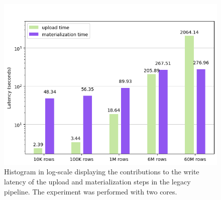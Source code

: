 \begin{figure}
\begin{minipage}[b]{\textwidth}
        \includegraphics[width=\textwidth]{figures/7-appendix/results_diagrams/write/hudi_upload_materialize/hudi_virtualiz2_core.png}
        \caption[Histogram of the write on legacy pipeline - Latency breakdown - 2 CPU cores]{Histogram in log-scale displaying the contributions to the write latency of the upload and materialization steps in the legacy pipeline. The experiment was performed with two  cores.}
        \label{fig:appx_hudi_virtualiz_breakdown_2_core}
    \end{minipage}
\end{figure}

